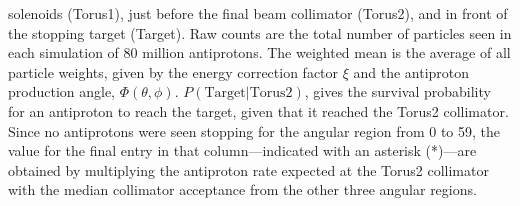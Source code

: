 {\begin{table}[p]
{solenoids (Torus1), just before the final beam collimator (Torus2), and in front of the
stopping target (Target).
Raw counts are the total number of particles seen in each simulation of 80
million antiprotons. The weighted mean is the average of all particle
weights, given by the energy correction factor $\xi$
and the antiproton production angle, $\Phi(\theta,\phi)$.
$P(\textrm{Target}|\textrm{Torus2})$, gives the survival
probability for an antiproton to reach the target, given that it reached the Torus2 collimator.
Since no antiprotons were seen stopping for the angular region from 0 to
59\degree, the value for the final entry in that column---indicated
with an asterisk (*)---are obtained by multiplying the antiproton rate
expected at the Torus2 collimator with the median collimator acceptance from
the other three angular regions.%
}
\end{table}\xspace}


